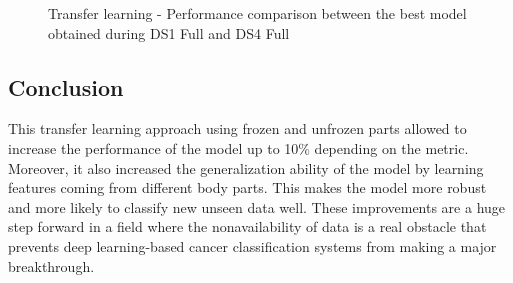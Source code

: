 \begin{figure}[!h]
\centering
\noindent
{}
\caption{Transfer learning - Performance comparison between the best model obtained during DS1 Full and DS4 Full}
\label{fig:tl_results_test_set}
\end{figure}


\subsection{Conclusion}
\setlength{\marginparwidth}{3cm}\leavevmode {}This transfer learning approach using frozen and unfrozen parts allowed to increase the performance of the model up to 10\% depending on the metric. Moreover, it also increased the generalization ability of the model by learning features coming from different body parts. This makes the model more robust and more likely to classify new unseen data well. These improvements are a huge step forward in a field where the nonavailability of data is a real obstacle that prevents deep learning-based cancer classification systems from making a major breakthrough.

